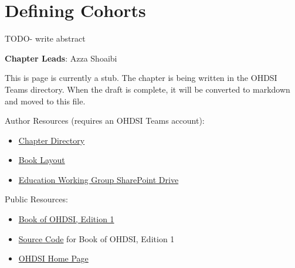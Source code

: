 \documentclass[
  letterpaper,
  paper=7in:10in,
  pagesize=pdftex,
  headinclude=on,
  footinclude=on,
  12pt]{scrbook}
\providecommand{\tightlist}{%
  \setlength{\itemsep}{0pt}\setlength{\parskip}{0pt}}\usepackage{longtable,booktabs,array}
\begin{document}
\chapter{Defining Cohorts}\label{sec-analytics-cohorts}

TODO- write abstract

\hfill\break

\textbf{Chapter Leads}: Azza Shoaibi

\begin{tcolorbox}[enhanced jigsaw, opacitybacktitle=0.6, coltitle=black, colback=white, bottomrule=.15mm, bottomtitle=1mm, title=\textcolor{quarto-callout-note-color}{\faInfo}\hspace{0.5em}{Note}, titlerule=0mm, rightrule=.15mm, colbacktitle=quarto-callout-note-color!10!white, colframe=quarto-callout-note-color-frame, toptitle=1mm, arc=.35mm, left=2mm, breakable, opacityback=0, leftrule=.75mm, toprule=.15mm]

This is page is currently a stub. The chapter is being written in the
OHDSI Teams directory. When the draft is complete, it will be converted
to markdown and moved to this file.

Author Resources (requires an OHDSI Teams account):

\begin{itemize}
\tightlist
\item
  \href{https://ohdsiorg.sharepoint.com/sites/Workgroup-EducationWorkingGroup/Shared\%20Documents/Forms/AllItems.aspx?id=\%2Fsites\%2FWorkgroup\%2DEducationWorkingGroup\%2FShared\%20Documents\%2FSection\%20III\%20\%2D\%20Analytics\%2FChapter\%2011\%20Defining\%20Cohorts&viewid=05fec2cc\%2Dec8a\%2D4d04\%2Db565\%2Dcf1289b96f67}{Chapter
  Directory}
\item
  \href{https://ohdsiorg.sharepoint.com/:x:/r/sites/Workgroup-EducationWorkingGroup/_layouts/15/Doc2.aspx?action=edit&sourcedoc=\%7B1fa31e39-1c5f-4918-b878-609ebd9810b3\%7D&wdOrigin=TEAMS-WEB.teamsSdk_ns.rwc&wdExp=TEAMS-TREATMENT&wdhostclicktime=1748104477731&web=1}{Book
  Layout}
\item
  \href{https://ohdsiorg.sharepoint.com/sites/Workgroup-EducationWorkingGroup/Shared\%20Documents/Forms/AllItems.aspx?viewid=05fec2cc\%2Dec8a\%2D4d04\%2Db565\%2Dcf1289b96f67}{Education
  Working Group SharePoint Drive}
\end{itemize}

Public Resources:

\begin{itemize}
\tightlist
\item
  \href{https://ohdsi.github.io/TheBookOfOhdsi/}{Book of OHDSI, Edition
  1}
\item
  \href{https://github.com/OHDSI/TheBookOfOhdsi}{Source Code} for Book
  of OHDSI, Edition 1
\item
  \href{https://ohdsi.org/}{OHDSI Home Page}
\end{itemize}

\end{tcolorbox}
\end{document}
